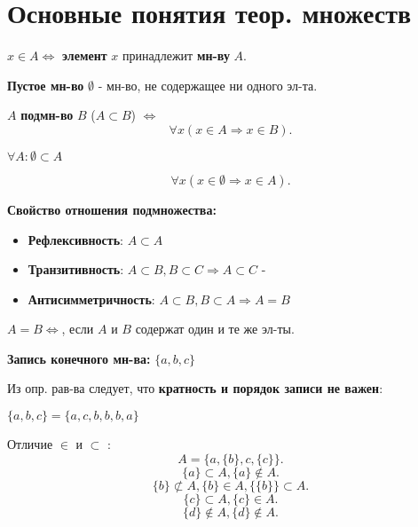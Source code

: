 \section{Основные понятия теор. множеств}
\begin{symb}
    $x \in A \iff$ \textbf{элемент } $x$ принадлежит \textbf{мн-ву} $A$.
\end{symb}
\begin{definition}
    \textbf{Пустое мн-во} $\emptyset$ - мн-во, не содержащее ни одного эл-та.
\end{definition}
\begin{definition}
    $A$ \textbf{подмн-во} $B$ ($A \subset B$) $\iff$ 
    \[
    \forall x (x \in A \Rightarrow x \in B)
    .\] 
\end{definition}
\begin{note}
    $\forall A \colon \emptyset \subset A$
\end{note}
\begin{note}
\[
\forall x (x \in \emptyset \Rightarrow x \in A)
.\] 
\end{note}
\textbf{Свойство отношения подмножества:}
\begin{itemize}
    \item \textbf{Рефлексивность}: $A \subset A$
    \item\textbf{Транзитивность}: $A \subset B, B \subset C \Rightarrow A \subset C$ - 
    \item \textbf{Антисимметричность}: $A \subset B, B \subset A \Rightarrow A = B$
\end{itemize}
\begin{definition}[Равенство мн-в]
$A = B \iff $, если $A$ и $B$ содержат один и те же эл-ты.
\end{definition}
\textbf{Запись конечного мн-ва:} $\{a, b, c\}$
 \begin{note}
 Из опр. рав-ва следует, что \textbf{кратность и порядок записи не важен}:
 \begin{example}
    $\{a, b, c\} = \{a, c, b, b, b, a\}$
 \end{example}
 
\end{note}
 
\begin{note}
Отличие $\in$ и $\subset$ :
\[
A = \{a, \{b\}, c, \{c\}\}
.\] 
\[
\{a\} \subset A, \{a\} \not\in A
.\]  
\[
\{b\} \not\subset A, \{b\} \in A, \{\{b\}\} \subset A
.\] 
\[
\{c\} \subset A, \{c\}\in A
.\] 
\[
\{d\} \not\in A, \{ d\}\not\in A 
.\] 
\end{note}


